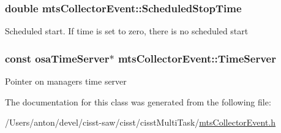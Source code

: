 \subsubsection[{Scheduled\+Stop\+Time}]{\setlength{\rightskip}{0pt plus 5cm}double mts\+Collector\+Event\+::\+Scheduled\+Stop\+Time\hspace{0.3cm}{\ttfamily [protected]}}\label{classmts_collector_event_ad7213ee6804878731b6d0d7effa3dd0a}
Scheduled start. If time is set to zero, there is no scheduled start \hypertarget{classmts_collector_event_a0bf692d3a1e6c8eb40b4ae32053dba2e}{}
\subsubsection[{Time\+Server}]{\setlength{\rightskip}{0pt plus 5cm}const {\bf osa\+Time\+Server}$\ast$ mts\+Collector\+Event\+::\+Time\+Server\hspace{0.3cm}{\ttfamily [protected]}}\label{classmts_collector_event_a0bf692d3a1e6c8eb40b4ae32053dba2e}
Pointer on manager\textquotesingle{}s time server 

The documentation for this class was generated from the following file\+:\begin{DoxyCompactItemize}
\item 
/\+Users/anton/devel/cisst-\/saw/cisst/cisst\+Multi\+Task/\hyperlink{mts_collector_event_8h}{mts\+Collector\+Event.\+h}\end{DoxyCompactItemize}

